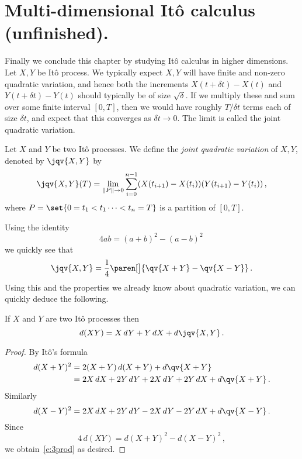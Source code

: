 \section{Multi-dimensional It\^o calculus (unfinished).}

Finally we conclude this chapter by studying It\^o calculus in higher dimensions.
Let $X, Y$ be It\^o process.
We typically expect $X,Y$ will have finite and non-zero quadratic variation, and hence both the increments $X(t +\delta t) - X(t)$ and $Y(t + \delta t) - Y(t)$ should typically be of size $\sqrt{\delta}$.
If we multiply these and sum over some finite interval $[0, T]$, then we would have roughly $T / \delta t$ terms each of size $\delta t$, and expect that this converges as $\delta t \to 0$.
The limit is called the joint quadratic variation.

\begin{definition}
  Let $X$ and $Y$ be two It\^o processes.
  We define the \emph{joint quadratic variation} of $X, Y$, denoted by $\jqv{X, Y}$ by 
  \begin{equation*}
    \jqv{X,Y}(T) = \lim_{\norm{P} \to 0} \sum_{i=0}^{n-1}(X(t_{i+1}) - X(t_i)) (Y(t_{i+1}) - Y(t_i))\,,
  \end{equation*}
  where $P = \set{0 = t_1 < t_1 \cdots < t_n = T}$ is a partition of $[0, T]$.
\end{definition}

Using the identity
\begin{equation*}
  4ab = (a+b)^2 - (a - b)^2\,
\end{equation*}
we quickly see that
\begin{equation}\label{e:3plgm}
  \jqv{X,Y} = \frac{1}{4} \paren[\big]{ \qv{X+Y} - \qv{X-Y} }\,.
\end{equation}
Using this and the properties we already know about quadratic variation, we can quickly deduce the following.
\begin{proposition}
  If $X$ and $Y$ are two It\^o processes then
  \begin{equation}\label{e:3prod}
    d(XY) = X \, dY + Y \, dX + d\jqv{X,Y}\,.
  \end{equation}
\end{proposition}
\begin{proof}
  By It\^o's formula
  \begin{align*}
    d(X+Y)^2 &= 2 (X + Y) \, d(X+Y) + d\qv{X+Y}\,
    \\
      &= 2 X \, dX + 2 Y \, dY + 2 X \, dY + 2 Y \, dX + d\qv{X+Y}\,.
  \end{align*}
  Similarly 
  \begin{equation*}
    d(X-Y)^2 = 2 X \, dX + 2 Y \, dY - 2 X \, dY - 2 Y \, dX + d\qv{X-Y}\,.
  \end{equation*}
  Since 
  \begin{equation*}
    4 \, d (XY) = d(X+Y)^2 - d( X-Y)^2\,,
  \end{equation*}
  we obtain~\eqref{e:3prod} as desired.
\end{proof}

